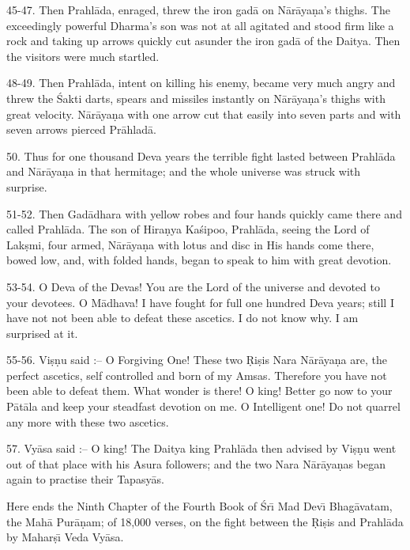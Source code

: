 45-47. Then Prahl\=ada, enraged, threw the iron gad\=a on N\=ar\=aya\d{n}a's thighs. The exceedingly powerful Dharma's son was not at all agitated and stood firm like a rock and taking up arrows quickly cut asunder the iron gad\=a of the Daitya. Then the visitors were much startled.

48-49. Then Prahl\=ada, intent on killing his enemy, became very much angry and threw the \'Sakti darts, spears and missiles instantly on N\=ar\=aya\d{n}a's thighs with great velocity. N\=ar\=aya\d{n}a with one arrow cut that easily into seven parts and with seven arrows pierced Pr\=ahlad\=a.

50. Thus for one thousand Deva years the terrible fight lasted between Prahl\=ada and N\=ar\=aya\d{n}a in that hermitage; and the whole universe was struck with surprise.

51-52. Then Gad\=adhara with yellow robes and four hands quickly came there and called Prahl\=ada. The son of Hira\d{n}ya Ka\'sipoo, Prahl\=ada, seeing the Lord of Lak\d{s}mi, four armed, N\=ar\=aya\d{n}a with lotus and disc in His hands come there, bowed low, and, with folded hands, began to speak to him with great devotion.

53-54. O Deva of the Devas! You are the Lord of the universe and devoted to your devotees. O M\=adhava! I have fought for full one hundred Deva years; still I have not not been able to defeat these ascetics. I do not know why. I am surprised at it.

55-56. Vi\d{s}\d{n}u said :-- O Forgiving One! These two \d{R}i\d{s}is Nara N\=ar\=aya\d{n}a are, the perfect ascetics, self controlled and born of my Amsas. Therefore you have not been able to defeat them. What wonder is there! O king! Better go now to your P\=at\=ala and keep your steadfast devotion on me. O Intelligent one! Do not quarrel any more with these two ascetics.

57. Vy\=asa said :-- O king! The Daitya king Prahl\=ada then advised by Vi\d{s}\d{n}u went out of that place with his Asura followers; and the two Nara N\=ar\=aya\d{n}as began again to practise their Tapasy\=as.

Here ends the Ninth Chapter of the Fourth Book of \'Sr\={\i} Mad Dev\={\i} Bhag\=avatam, the Mah\=a Pur\=a\d{n}am; of 18,000 verses, on the fight between the \d{R}i\d{s}is and Prahl\=ada by Mahar\d{s}\={\i} Veda Vy\=asa.



